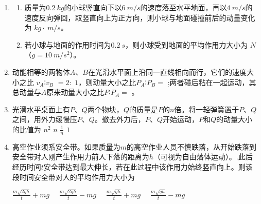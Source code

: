 
\begin{enumerate}[leftmargin=0em]
\renewcommand{\labelenumi}{\arabic{enumi}.}
\item
{}
\begin{enumerate}
\renewcommand{\labelenumi}{\arabic{enumi}.}
\item
质量为$ 0.2 \ kg $的小球竖直向下以$ 6 \ m/s $的速度落至水平地面，再以$ 4 \ m/s $的速度反向弹回，取竖直向上为正方向，则小球与地面碰撞前后的动量变化为  $ kg \cdot \ m/s $。
\item 
若小球与地面的作用时间为$ 0.2 \ s $，则小球受到地面的平均作用力大小为  $ N $（$ g=10 \ m/s ^{2} $）。



\end{enumerate}

\item 
{}
动能相等的两物体$ A $、$ B $在光滑水平面上沿同一直线相向而行，它们的速度大小之比
$ v_{A} $∶$ v_{B} $ $ =2: $ $ 1 $，则动量大小之比$ P_{A} $∶$ P_{B} = $  ;两者碰后粘在一起运动，其总动量与$ A $原来动量大小之比$ P $∶$ P_{A} = $  。


\item 
{}
光滑水平桌面上有$ P $、$ Q $两个物块，$ Q $的质量是$ P $的$ n $倍。将一轻弹簧置于$ P $、$ Q $之间，用外力缓慢压$ P $、$ Q $。撤去外力后，$ P $、$ Q $开始运动，$ P $和$ Q $的动量大小的比值为  
\fourchoices
{$ n^{2} $}
{$ n $}
{$ \frac{1}{n} $}
{$ 1 $}




\item
{}
高空作业须系安全带。如果质量为$ m $的高空作业人员不慎跌落，从开始跌落到安全带对人刚产生作用力前人下落的距离为$ h $（可视为自由落体运动）。.此后经历时间$ t $安全带达到最大伸长，若在此过程中该作用力始终竖直向上。则该段时间安全带对人的平均作用力大小为  

\fourchoices
{$\frac { m \sqrt { 2 g h } } { t } + m g \quad$}
{$\frac { m \sqrt { 2 g h } } { t } - m g \quad$}
{$\frac { m \sqrt { g h } } { t } + m g \quad$}
{$\frac { m \sqrt { g h } } { t } - m g$}



\end{enumerate}
